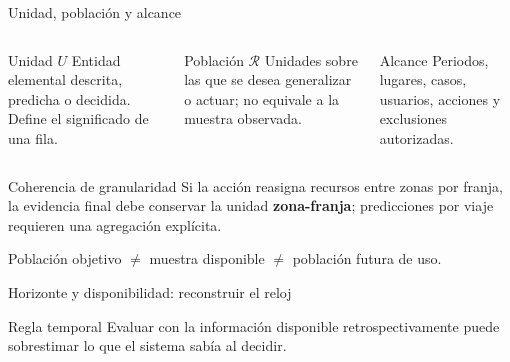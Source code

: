 \documentclass[aspectratio=169,11pt]{beamer}
\newcommand{\br}{\\}
\begin{document}
\begin{frame}{Unidad, población y alcance}
  \begin{columns}[T]
      \begin{block}{Unidad $U$}
        Entidad elemental descrita, predicha o decidida. Define el significado de una fila.
      \end{block}
      \begin{block}{Población $\mathcal R$}
        Unidades sobre las que se desea generalizar o actuar; no equivale a la muestra observada.
      \end{block}
      \begin{block}{Alcance}
        Periodos, lugares, casos, usuarios, acciones y exclusiones autorizadas.
      \end{block}
  \end{columns}
  \vspace{0.5em}
  \begin{alertblock}{Coherencia de granularidad}
    Si la acción reasigna recursos entre zonas por franja, la evidencia final debe conservar la unidad \textbf{zona-franja}; predicciones por viaje requieren una agregación explícita.
  \end{alertblock}
  \centering Población objetivo $\neq$ muestra disponible $\neq$ población futura de uso.
\end{frame}

\begin{frame}{Horizonte y disponibilidad: reconstruir el reloj}
  \centering
  \vfill
  \begin{block}{Regla temporal}
    Evaluar con la información disponible retrospectivamente puede sobrestimar lo que el sistema sabía al decidir.
  \end{block}
\end{frame}
\end{document}
